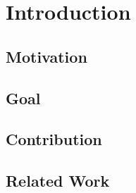\chapter{Introduction}
\label{ch:Introduction}

\section{Motivation}
\label{sec:Motivation}

\section{Goal}
\label{sec:Goal}

\section{Contribution}
\label{sec:Contribution}

\section{Related Work}
\label{sec:RelatedWork}